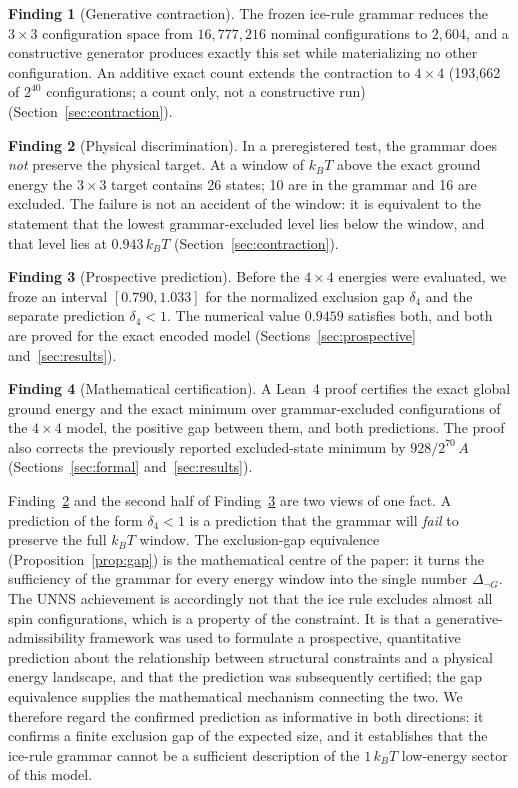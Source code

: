 \documentclass[11pt,a4paper]{article}
\theoremstyle{plain}
\theoremstyle{definition}
\newtheorem{finding}{Finding}
\theoremstyle{remark}
\newcommand{\dnG}{\Delta_{\neg G}}
\newcommand{\kBT}{k_{B}T}
\begin{document}
\begin{finding}[Generative contraction]\label{f:I}
The frozen ice-rule grammar reduces the $3\times3$ configuration space from $16{,}777{,}216$ nominal configurations to $2{,}604$, and a constructive generator produces exactly this set while materializing no other configuration. An additive exact count extends the contraction to $4\times4$ (193{,}662 of $2^{40}$ configurations; a count only, not a constructive run) (Section~\ref{sec:contraction}).
\end{finding}
\begin{finding}[Physical discrimination]\label{f:II}
In a preregistered test, the grammar does \emph{not} preserve the physical target. At a window of $\kBT$ above the exact ground energy the $3\times3$ target contains 26 states; 10 are in the grammar and 16 are excluded. The failure is not an accident of the window: it is equivalent to the statement that the lowest grammar-excluded level lies below the window, and that level lies at $0.943\,\kBT$ (Section~\ref{sec:contraction}).
\end{finding}
\begin{finding}[Prospective prediction]\label{f:III}
Before the $4\times4$ energies were evaluated, we froze an interval $[0.790,1.033]$ for the normalized exclusion gap $\delta_4$ and the separate prediction $\delta_4<1$. The numerical value $0.9459$ satisfies both, and both are proved for the exact encoded model (Sections~\ref{sec:prospective} and~\ref{sec:results}).
\end{finding}
\begin{finding}[Mathematical certification]\label{f:IV}
A Lean~4 proof certifies the exact global ground energy and the exact minimum over grammar-excluded configurations of the $4\times4$ model, the positive gap between them, and both predictions. The proof also corrects the previously reported excluded-state minimum by $928/2^{70}\,A$ (Sections~\ref{sec:formal} and~\ref{sec:results}).
\end{finding}

Finding~\ref{f:II} and the second half of Finding~\ref{f:III} are two views of one fact. A prediction of the form $\delta_4<1$ is a prediction that the grammar will \emph{fail} to preserve the full $\kBT$ window. The exclusion-gap equivalence (Proposition~\ref{prop:gap}) is the mathematical centre of the paper: it turns the sufficiency of the grammar for every energy window into the single number $\dnG$. The UNNS achievement is accordingly not that the ice rule excludes almost all spin configurations, which is a property of the constraint. It is that a generative-admissibility framework was used to formulate a prospective, quantitative prediction about the relationship between structural constraints and a physical energy landscape, and that the prediction was subsequently certified; the gap equivalence supplies the mathematical mechanism connecting the two. We therefore regard the confirmed prediction as informative in both directions: it confirms a finite exclusion gap of the expected size, and it establishes that the ice-rule grammar cannot be a sufficient description of the $1\,\kBT$ low-energy sector of this model.
\end{document}

